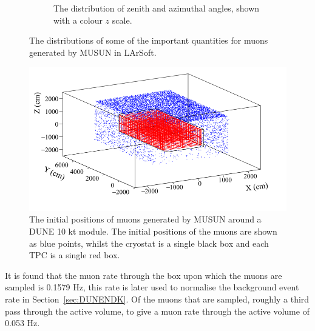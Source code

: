 \begin{figure}[h!]
\begin{subfigure}{0.45\textwidth}
    \caption{The distribution of zenith and azimuthal angles, shown with a colour $z$ scale.}
  \end{subfigure}
  \caption[The distributions of some of the important quantities for muons generated by MUSUN in LArSoft]
          {The distributions of some of the important quantities for muons generated by MUSUN in LArSoft.}
  \label{fig:MUSUNIncorp}
\end{figure}

\begin{figure}[h!]
  \centering
  \includegraphics[width=\textwidth]{MuonPosCan}
  \caption[The initial positions of muons generated by MUSUN around a DUNE 10 kt module]
          {The initial positions of muons generated by MUSUN around a DUNE 10 kt module. The initial positions of the muons are shown as blue points, whilst the cryostat is a single black box and each TPC is a single red box.}
  \label{fig:10ktPos}
\end{figure}

It is found that the muon rate through the box upon which the muons are sampled is 0.1579 Hz, this rate is later used to normalise the background event rate in Section~\ref{sec:DUNENDK}. Of the muons that are sampled, roughly a third pass through the active volume, to give a muon rate through the active volume of 0.053 Hz. \\ 

